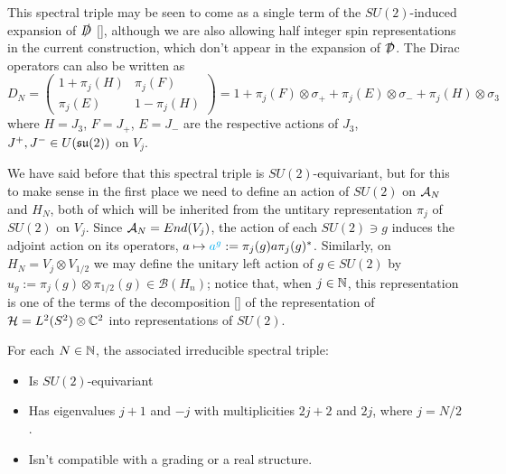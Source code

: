 This spectral triple may be seen to come as a single term of the $SU(2)$-induced expansion of $\slashed D$ \eqref{}, although we are also allowing  half integer spin representations in the current construction, which don't appear in the expansion of $\slashed {\mathcal D}$. The Dirac operators can also be written as
\begin{equation}
    D_N = \begin{pmatrix} 1 + \pi_j(H) & \pi_j(F) \\ \pi_j(E) & 1 - \pi_j(H)\end{pmatrix} 
    = 1 + \pi_j(F) \otimes \sigma_+ + \pi_j(E) \otimes \sigma_- + \pi_j(H) \otimes \sigma_3
\end{equation}
where $H = J_3$, $F = J_+$, $E = J_-$ are the respective actions of $J_3$, $J^+, J^- \in U(\mathfrak{su}(2))$ on $V_j$.

We have said before that this spectral triple is $SU(2)$-equivariant, but for this to make sense in the first place we need to define an action of $SU(2)$ on $\mathcal A_N$ and $H_N$, both of which will be inherited from the untitary representation $\pi_j$ of $SU(2)$ on $V_j$. Since $\mathcal A_N = End(V_j)$, the action of each $SU(2) \ni g$ induces the adjoint action on its operators, $a \mapsto \textcolor{cyan}{a^g} := \pi_j(g) a \pi_j(g)^*$. Similarly, on $H_N = V_j \otimes V_{1/2}$ we may define the unitary left action of $g \in SU(2)$ by $u_g := \pi_j(g) \otimes \pi_{1/2}(g) \in \mathcal B(H_n)$; notice that, when $j \in \mathbb{N}$, this representation is one of the terms of the decomposition \eqref{} of the representation of $\mathcal H = L^2(S^2) \otimes \mathbb{C}^2$ into representations of $SU(2)$.

\begin{proposition}\label{propIrredSpectralTriple}
For each $N \in \mathbb{N}$, the associated irreducible spectral triple:

    \begin{itemize}
        
    \item Is $SU(2)$-equivariant
    
    \item Has eigenvalues $j+1$ and $-j$ with multiplicities $2j+2$ and $2j$, where $j = N/2$.
        
    \item Isn't compatible with a grading or a real structure.
    \end{itemize}
\end{proposition}

